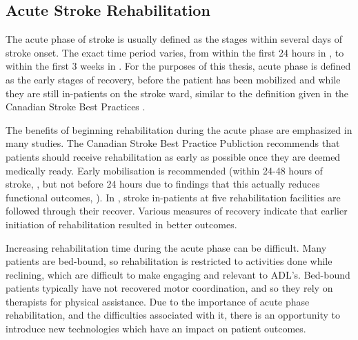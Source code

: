 \documentclass[12pt]{report}
\begin{document}
\subsection{Acute Stroke Rehabilitation}

The acute phase of stroke is usually defined as the stages within several days of stroke onset. The exact time period varies, from within the first 24 hours in \cite{Veerbeek2014}, to within the first 3 weeks in \cite{Cameirao2008}. For the purposes of this thesis, acute phase is defined as the early stages of recovery, before the patient has been mobilized and while they are still in-patients on the stroke ward, similar to the definition given in the Canadian Stroke Best Practices \cite{Casaubon2016}. 

The benefits of beginning rehabilitation during the acute phase are emphasized in many studies. The Canadian Stroke Best Practice Publiction recommends that patients should receive rehabilitation as early as possible once they are deemed medically ready. Early mobilisation is recommended (within 24-48 hours of stroke, \cite{Casaubon2016}, but not before 24 hours due to findings that this actually reduces functional outcomes, \cite{AVERTTrialCollaborationgroup2015}). In \cite{Horn2005}, stroke in-patients at five rehabilitation facilities are followed through their recover. Various measures of recovery indicate that earlier initiation of rehabilitation resulted in better outcomes. 

Increasing rehabilitation time during the acute phase can be difficult. Many patients are bed-bound, so rehabilitation is restricted to activities done while reclining, which are difficult to make engaging and relevant to ADL's. Bed-bound patients typically have not recovered motor coordination, and so they rely on therapists for physical assistance. Due to the importance of acute phase rehabilitation, and the difficulties associated with it, there is an opportunity to introduce new technologies which have an impact on patient outcomes. 
\end{document}
